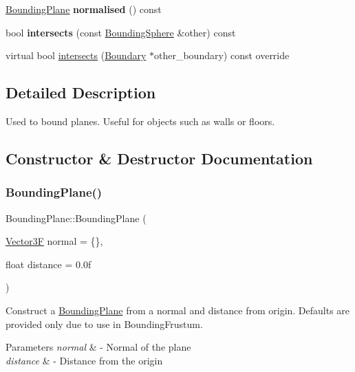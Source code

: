\begin{DoxyCompactItemize}
\mbox{\label{class_bounding_plane_aa271e305ed07117a8c82eedf1fd0f037}} 
\mbox{\hyperlink{class_bounding_plane}{Bounding\+Plane}} {\bfseries normalised} () const
\item 
\mbox{\label{class_bounding_plane_af55931eb0667bcfaa91db85abcddc7a6}} 
bool {\bfseries intersects} (const \mbox{\hyperlink{class_bounding_sphere}{Bounding\+Sphere}} \&other) const
\item 
virtual bool \mbox{\hyperlink{class_bounding_plane_a3d956121121f32384cab3cab34544d6e}{intersects}} (\mbox{\hyperlink{class_boundary}{Boundary}} $\ast$other\+\_\+boundary) const override
\end{DoxyCompactItemize}


\subsection{Detailed Description}
Used to bound planes. Useful for objects such as walls or floors. 

\subsection{Constructor \& Destructor Documentation}
\mbox{\label{class_bounding_plane_ad25000eaea20874698ae4b40bb84fb41}} 
\subsubsection{\texorpdfstring{Bounding\+Plane()}{BoundingPlane()}}
{\footnotesize\ttfamily Bounding\+Plane\+::\+Bounding\+Plane (\begin{DoxyParamCaption}\item[{\mbox{\hyperlink{class_vector3}{Vector3F}}}]{normal = {\ttfamily \{\}},  }\item[{float}]{distance = {\ttfamily 0.0f} }\end{DoxyParamCaption})}

Construct a \mbox{\hyperlink{class_bounding_plane}{Bounding\+Plane}} from a normal and distance from origin. Defaults are provided only due to use in Bounding\+Frustum. 
\begin{DoxyParams}{Parameters}
{\em normal} & -\/ Normal of the plane \\
\hline
{\em distance} & -\/ Distance from the origin \\
\hline
\end{DoxyParams}


